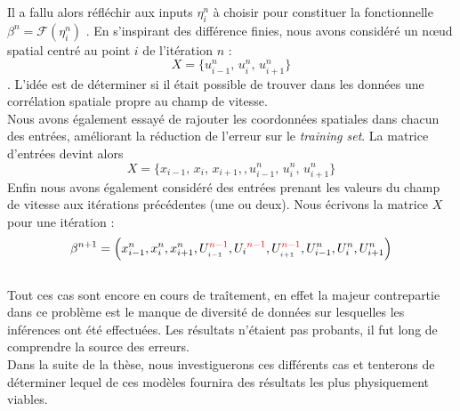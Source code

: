 \documentclass[a4paper,12pt]{article}
\newcommand{\bepar}[1]{
	\left( #1 \right)  
}
\newcommand\bk{\color{black}}
\newcommand\red{\color{red}}
\numberwithin{equation}{section} %
\begin{document}
\noindent Il a fallu alors réfléchir aux inputs $\eta_i^n$ à choisir pour constituer la fonctionnelle $\beta^n = \mathcal{F}\bepar{\eta_i^n}$ . En s'inspirant des différence finies, nous avons considéré un nœud spatial centré au point $i$ de l'itération $n$ : $$X = \{ u^n_{i-1},\, u^n_{i},\, u^n_{i+1}\}$$. L'idée est de déterminer si il était possible de trouver dans les données une corrélation spatiale propre au champ de vitesse.\\
Nous avons également essayé de rajouter les coordonnées spatiales dans chacun des entrées, améliorant la réduction de l'erreur sur le \textit{training set}. La matrice d'entrées devint alors $$X = \{ x_{i-1}, \, x_i,\, x_{i+1},, u^n_{i-1},\, u^n_{i},\, u^n_{i+1}\}$$
Enfin nous avons également considéré des entrées prenant les valeurs du champ de vitesse aux itérations précédentes (une ou deux). Nous écrivons la matrice $X$ pour une itération : $$ \beta^{n+1} = \bepar{x_{i-1}^n, x_i^n, x^n_{i+1}, U_{_{\bk i-1}}^{\red n-1}, U_{\bk i}^{\red n-1}, U_{_{\bk i+1}}^{\red n-1}, U_{i-1}^n, U_i^n, U^n_{i+1}} $$\\
Tout ces cas sont encore en cours de traîtement, en effet la majeur contrepartie dans ce problème est le manque de diversité de données sur lesquelles les inférences ont été effectuées. Les résultats n'étaient pas probants, il fut long de comprendre la source des erreurs. \\
Dans la suite de la thèse, nous investiguerons ces différents cas et tenterons de déterminer lequel de ces modèles fournira des résultats les plus physiquement viables.\\
\end{document}

